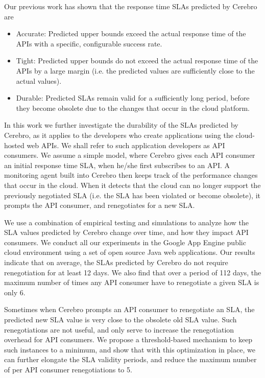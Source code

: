 Our previous work has shown that the response time SLAs predicted by Cerebro are
\begin{itemize}
\item Accurate: Predicted upper bounds exceed the actual response time of the APIs
with a specific, configurable success rate.
\item Tight: Predicted upper bounds do not exceed the actual response time of the APIs by
a large margin (i.e. the predicted values are sufficiently close to the actual values).
\item Durable: Predicted SLAs remain valid for a sufficiently long period, before they
become obsolete due to the changes that occur in the cloud platform.
\end{itemize}

In this work we further investigate the durability of the SLAs predicted by Cerebro, 
as it applies to the developers who create applications using the cloud-hosted web APIs.
We shall refer to such application developers as API consumers. We
assume a simple model, where Cerebro gives each API consumer an initial response
time SLA, when he/she first subscribes to an API. A monitoring agent built into
Cerebro then keeps
track of the performance changes that occur in the cloud. When it detects that the cloud
can no longer support the previously negotiated SLA (i.e. the SLA has been
violated or become obsolete), it prompts the API consumer, and renegotiates for a new
SLA.

We use a combination of empirical testing and simulations to analyze how the SLA values
predicted by Cerebro change over time, and how they impact API consumers. We
conduct all our experiments in the Google App Engine public cloud environment 
using a set of open source Java web applications. Our results indicate that on average, the
SLAs predicted by Cerebro do not require renegotiation for at least 12 days. We also find that
over a period of 112 days, the maximum number of times any API consumer have to
renegotiate a given SLA is only 6. 

Sometimes when Cerebro prompts an API consumer to
renegotiate an SLA, the predicted new SLA value is very close to the obsolete old SLA value. 
Such renegotiations are not useful, and only serve to increase the renegotiation overhead
for API consumers. We
propose a threshold-based mechanism to keep such instances to a minimum, and show that
with this optimization in place, we can further elongate the SLA validity periods, and reduce
the maximum number of per API consumer renegotiations to 5. 